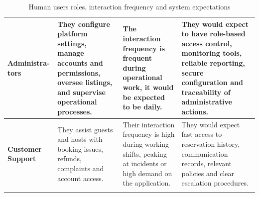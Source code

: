\begin{longtable}{|L{0.15\textwidth}|L{0.27\textwidth}|L{0.25\textwidth}|L{0.27\textwidth}|}
    \textbf{Administra-tors} &
    They configure platform settings, manage accounts and permissions, oversee listings, and supervise operational 
    processes. &
    The interaction frequency is frequent during operational work, it would be expected to be daily. &
    They would expect to have role-based access control, monitoring tools, reliable reporting, secure configuration 
    and traceability of administrative actions. \\
    \hline

    \textbf{Customer Support} &
    They assist guests and hosts with booking issues, refunds, complaints and account access. &
    Their interaction frequency is high during working shifts, peaking at incidents or high demand on the application. &
    They would expect fast access to reservation history, communication records, relevant policies and clear 
    escalation procedures. \\
    \hline

    \caption{Human users roles, interaction frequency and system expectations}
    \label{tab:human_users}
\end{longtable}



